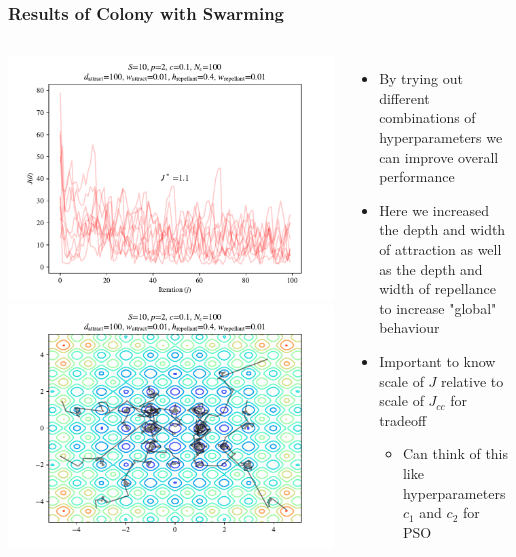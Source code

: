 \documentclass{beamer}
\begin{document}
\begin{frame}
\frametitle{Results of Colony with Swarming}
\begin{columns}[T]
    \begin{center}
      \includegraphics[scale=0.3]{assets/rastrigin_colony_tuned_J}
      \includegraphics[scale=0.3]{assets/rastrigin_colony_tuned_theta}
    \end{center}
    \begin{itemize}
      \item<1-> By trying out different combinations of hyperparameters we can improve overall performance
      \item<1-> Here we increased the depth and width of attraction as well as the depth and width of repellance to increase "global" behaviour
      \item<2-> Important to know scale of $J$ relative to scale of $J_{cc}$ for tradeoff
      \begin{itemize}
        \item<2-> Can think of this like hyperparameters $c_1$ and $c_2$ for PSO
      \end{itemize}
    \end{itemize}
\end{columns}
\end{frame}
\end{document}
